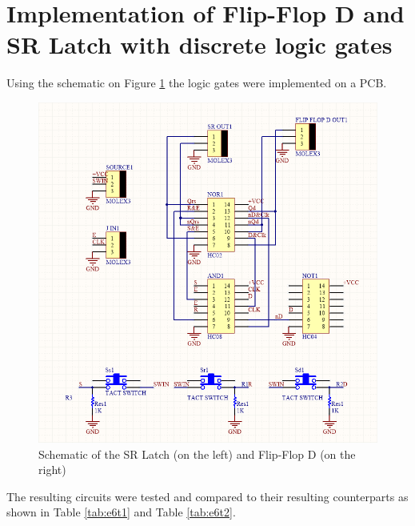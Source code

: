 \documentclass[a4paper]{article}
\begin{document}
        \section{Implementation of Flip-Flop D and SR Latch with discrete logic gates}
        Using the schematic on Figure \ref{fig:Schem} the logic gates were implemented on a PCB.
        
        \begin{figure}[h!]
            \begin{center}
                \includegraphics[width=\linewidth]{e6Schem.png}
                \caption{Schematic of the  SR Latch (on the left) and Flip-Flop D (on the right)}
            \end{center}
            \label{fig:Schem}
        \end{figure}

        The resulting circuits were tested and compared to their resulting counterparts as shown in
        Table \ref{tab:e6t1} and Table \ref{tab:e6t2}.

        \begin{table}[ht]
            \begin{center}
                
                \label{tab:e6t1}
            \end{center}
        \end{table}
        \begin{table}[ht]
            \begin{center}
                
                \label{tab:e6t2}
            \end{center}
        \end{table}
    
\end{document}
